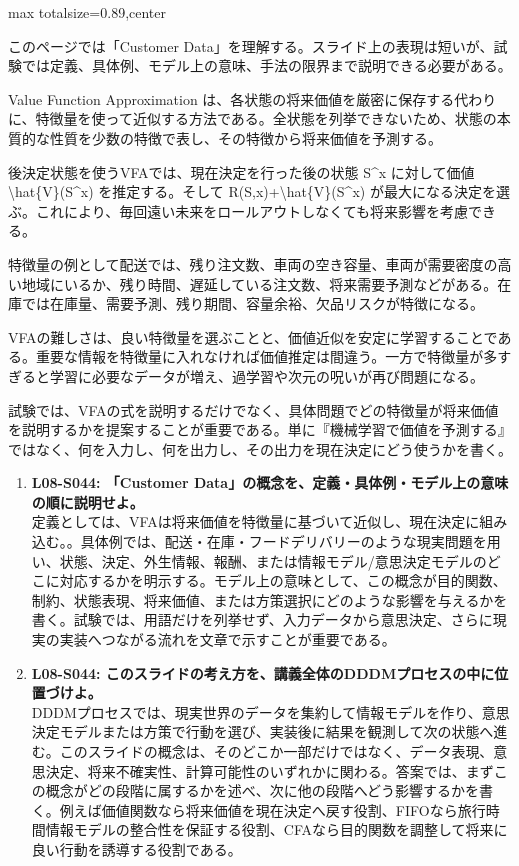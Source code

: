 \begin{minipage}[t]{0.58\textwidth}
\begin{adjustbox}{max totalsize={\textwidth}{0.89\textheight},center}
\begin{minipage}{\textwidth}\scriptsize
{}このページでは「Customer Data」を理解する。スライド上の表現は短いが、試験では定義、具体例、モデル上の意味、手法の限界まで説明できる必要がある。\par
Value Function Approximation は、各状態の将来価値を厳密に保存する代わりに、特徴量を使って近似する方法である。全状態を列挙できないため、状態の本質的な性質を少数の特徴で表し、その特徴から将来価値を予測する。\par
後決定状態を使うVFAでは、現在決定を行った後の状態 S\textasciicircum{}x に対して価値 \textbackslash{}hat\{V\}(S\textasciicircum{}x) を推定する。そして R(S,x)+\textbackslash{}hat\{V\}(S\textasciicircum{}x) が最大になる決定を選ぶ。これにより、毎回遠い未来をロールアウトしなくても将来影響を考慮できる。\par
特徴量の例として配送では、残り注文数、車両の空き容量、車両が需要密度の高い地域にいるか、残り時間、遅延している注文数、将来需要予測などがある。在庫では在庫量、需要予測、残り期間、容量余裕、欠品リスクが特徴になる。\par
VFAの難しさは、良い特徴量を選ぶことと、価値近似を安定に学習することである。重要な情報を特徴量に入れなければ価値推定は間違う。一方で特徴量が多すぎると学習に必要なデータが増え、過学習や次元の呪いが再び問題になる。\par
試験では、VFAの式を説明するだけでなく、具体問題でどの特徴量が将来価値を説明するかを提案することが重要である。単に『機械学習で価値を予測する』ではなく、何を入力し、何を出力し、その出力を現在決定にどう使うかを書く。\par{}\begin{enumerate}\item \textbf{L08-S044: 「Customer Data」の概念を、定義・具体例・モデル上の意味の順に説明せよ。}\\定義としては、VFAは将来価値を特徴量に基づいて近似し、現在決定に組み込む。。具体例では、配送・在庫・フードデリバリーのような現実問題を用い、状態、決定、外生情報、報酬、または情報モデル/意思決定モデルのどこに対応するかを明示する。モデル上の意味として、この概念が目的関数、制約、状態表現、将来価値、または方策選択にどのような影響を与えるかを書く。試験では、用語だけを列挙せず、入力データから意思決定、さらに現実の実装へつながる流れを文章で示すことが重要である。\item \textbf{L08-S044: このスライドの考え方を、講義全体のDDDMプロセスの中に位置づけよ。}\\DDDMプロセスでは、現実世界のデータを集約して情報モデルを作り、意思決定モデルまたは方策で行動を選び、実装後に結果を観測して次の状態へ進む。このスライドの概念は、そのどこか一部だけではなく、データ表現、意思決定、将来不確実性、計算可能性のいずれかに関わる。答案では、まずこの概念がどの段階に属するかを述べ、次に他の段階へどう影響するかを書く。例えば価値関数なら将来価値を現在決定へ戻す役割、FIFOなら旅行時間情報モデルの整合性を保証する役割、CFAなら目的関数を調整して将来に良い行動を誘導する役割である。\end{enumerate}

\end{minipage}
\end{adjustbox}
\end{minipage}
